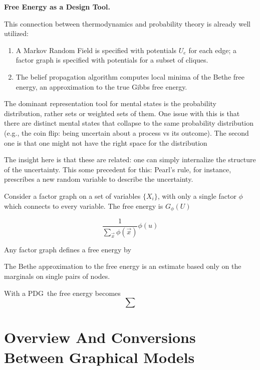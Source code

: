 \documentclass{article}
\newcommand{\MN}{PDG}
\numberwithin{equation}{section}
\begin{document}
	
	


	
	\textbf{Free Energy as a Design Tool.}
	
	This connection between thermodynamics and probability theory is already well utilized:
	\begin{enumerate}
		\item A Markov Random Field is specified with potentials $U_e$ for each edge; a factor graph is specified with potentials for a subset of cliques.
		\item The belief propagation algorithm computes local minima of the Bethe free energy, an approximation to the true Gibbs free energy.
	\end{enumerate}


	The dominant representation tool for mental states is the probability distribution, rather sets or weighted sets of them. %
	One issue with this is that there are distinct mental states that collapse to the same probability distribution (e.g., the coin flip: being uncertain about a process vs its outcome). The second one is that one might not have the right space for the distribution
	
	The insight here is that these are related: one can simply internalize the structure of the uncertainty. This some precedent for this: Pearl's rule, for instance, prescribes a new random variable to describe the uncertainty.	
	
	Consider a factor graph on a set of variables $\{ X_i \}$, with only a single factor $\phi$ which connects to every variable. The free energy is $G_\phi(U)$
	
	\[ \frac{1}{\sum_{\vec x} \phi(\vec x)} \phi(u) \]
	
	
	Any factor graph defines a free energy by 
	
	The Bethe approximation to the free energy is an estimate based only on the marginals on single pairs of nodes.
		
	With a \MN\, the free energy becomes
	\[ \sum \]
	
	\section{Overview And Conversions Between Graphical Models}
	\label{sec:many-relations-graphical-models}
	
\end{document}
